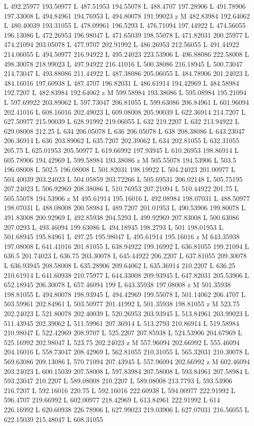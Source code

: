 {\begin{scope}[local bounding box=bb]
{L 492.25977 193.50977 L 487.51953 194.55078 L 488.4707 197.28906 L 491.78906 197.33008 L 494.84961 194.76953 L 494.80078 191.99023 z M 482.83984 192.64062 L 480.40039 193.31055 L 478.09961 196.5293 L 476.71094 197.44922 L 474.56055 196.13086 L 472.26953 196.98047 L 471.65039 198.55078 L 471.82031 200.25977 L 474.21094 203.05078 L 477.9707 202.91992 L 486.26953 212.56055 L 491.44922 214.06055 L 494.50977 216.94922 L 495.24023 223.53906 L 496.88086 222.58008 L 498.30078 218.99023 L 497.94922 216.41016 L 500.38086 216.18945 L 500.73047 214.73047 L 493.88086 211.44922 L 487.38086 205.06055 L 484.78906 201.24023 L 484.16016 197.60938 L 487.4707 196.82031 L 486.61914 194.42969 L 484.58984 192.7207 L 482.83984 192.64062 z M 599.58984 193.38086 L 595.08984 195.21094 L 597.69922 203.89062 L 597.73047 206.81055 L 599.63086 206.84961 L 601.96094 202.41016 L 608.16016 202.49023 L 609.08008 205.90039 L 622.36914 214.7207 L 627.50977 215.90039 L 628.91992 219.06055 L 632 219.2207 L 632 213.94922 L 629.08008 212.25 L 634 206.05078 L 636 206.05078 L 638 208.38086 L 643.23047 206.36914 L 636 203.89062 L 635.7207 202.39062 L 634 202.81055 L 632.31055 205.75 L 625.01953 205.50977 L 619.66992 197.93945 L 610.26953 198.86914 L 605.78906 194.42969 L 599.58984 193.38086 z M 505.55078 194.53906 L 503.5 196.08008 L 502.5 196.08008 L 501.82031 198.19922 L 504.24023 201.00977 L 504.40039 203.24023 L 504.05859 203.72266 L 505.69531 206.02148 L 505.75195 207.24023 L 506.92969 208.38086 L 510.76953 207.21094 L 510.44922 201.75 L 505.55078 194.53906 z M 495.61914 195.16016 L 492.08984 198.07031 L 488.50977 198.07031 L 488.08008 200.58984 L 489.7207 201.01953 L 490.53906 199.80078 L 491.83008 200.92969 L 492.85938 204.5293 L 499.92969 207.83008 L 500.63086 207.0293 L 493.46094 199.63086 L 494.18945 198.2793 L 501 198.01953 L 501.68945 195.84961 L 497.25 195.98047 L 495.61914 195.16016 z M 643.35938 197.08008 L 641.41016 201.81055 L 638.94922 199.16992 L 636.81055 199.21094 L 636.5 201.74023 L 636.75 203.30078 L 645.44922 206.2207 L 637.81055 209.30078 L 636.93945 208.58008 L 635.28906 209.64062 L 635.36914 210.2207 L 636.25 210.61914 L 641.60938 210.75977 L 644.33008 209.93945 L 647.82031 205.53906 L 652.18945 206.30078 L 657.46094 199 L 643.35938 197.08008 z M 501.35938 198.81055 L 494.80078 198.93945 L 494.42969 199.55078 L 501.14062 206.4707 L 503.59961 202.84961 L 503.50977 201.41992 L 501.35938 198.81055 z M 523.75 202.24023 L 521.80078 202.40039 L 520.26953 203.93945 L 513.84961 203.99023 L 511.43945 202.39062 L 511.59961 207.36914 L 513.2793 210.86914 L 519.58984 210.98047 L 522.42969 208.9707 L 525.2207 207.85938 L 524.53906 204.67969 L 525.16992 202.98047 L 523.75 202.24023 z M 557.96094 202.66992 L 555.46094 204.16016 L 558.73047 208.42969 L 562.81055 210.31055 L 565.32031 210.30078 L 569.63086 209.13086 L 570.71094 207.43945 L 557.96094 202.66992 z M 602.46094 203.24023 L 600.15039 207.58008 L 597.83984 207.58008 L 593.84961 207.58984 L 593.23047 210.2207 L 589.08008 210.2207 L 589.08008 213.7793 L 593.53906 216.7207 L 592.16016 220.75 L 592.16016 222.60938 L 594.00977 222.91992 L 596.4707 219.66992 L 602.00977 218.42969 L 613.84961 222.91992 L 614 226.16992 L 620.60938 226.78906 L 627.99023 219.03906 L 627.07031 216.56055 L 622.15039 215.48047 L 608.31055 }
\end{scope}}
